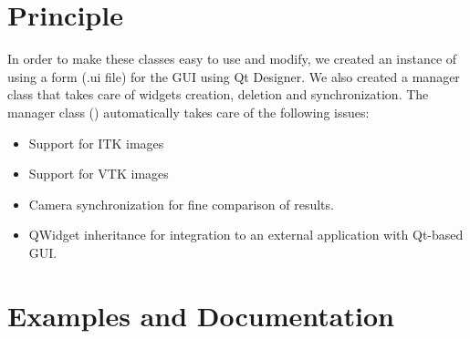\documentclass{InsightArticle}
\begin{document}
\section{Principle}
In order to make these classes easy to use and modify, we created an instance of  using a form (.ui file) for the GUI using Qt Designer. We also created a manager class that takes care of widgets creation, deletion and synchronization. The manager class () automatically takes care of the following issues:
\begin{itemize}
  \item Support for ITK images
  \item Support for VTK images
  \item Camera synchronization for fine comparison of results.
  \item QWidget inheritance for integration to an external application with Qt-based GUI.
\end{itemize}


\section{Examples and Documentation}
\end{document}
